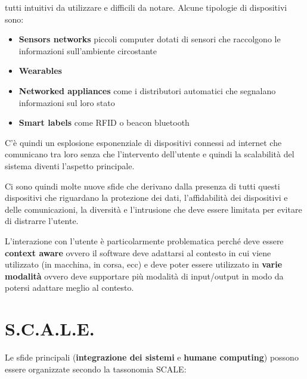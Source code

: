 tutti intuitivi da utilizzare e difficili da notare.
Alcune tipologie di dispositivi sono:

\begin{itemize}
\item \textbf{Sensors networks} piccoli computer dotati di sensori che
  raccolgono le informazioni sull'ambiente circostante
\item \textbf{Wearables}
\item \textbf{Networked appliances} come i distributori automatici che
  segnalano informazioni sul loro stato
\item \textbf{Smart labels} come RFID o beacon bluetooth

\end{itemize}

C'è quindi un esplosione esponenziale di dispositivi connessi ad
internet che comunicano tra loro senza che l'intervento dell'utente e
quindi la scalabilità del sistema diventi l'aspetto principale.

Ci sono quindi molte nuove sfide che derivano dalla presenza di tutti
questi dispositivi che riguardano la protezione dei dati, l'affidabilità
dei dispositivi e delle comunicazioni, la diversità e l'intrusione che
deve essere limitata per evitare di distrarre l'utente.

L'interazione con l'utente è particolarmente problematica perché deve
essere \textbf{context aware} ovvero il software deve adattarsi al
contesto in cui viene utilizzato (in macchina, in corsa, ecc) e deve
poter essere utilizzato in \textbf{varie modalità} ovvero deve
supportare più modalità di input/output in modo da potersi adattare
meglio al contesto.

\section{S.C.A.L.E.}
\label{s.c.a.l.e.}

Le sfide principali (\textbf{integrazione dei sistemi} e \textbf{humane
computing}) possono essere organizzate secondo la tassonomia SCALE:

